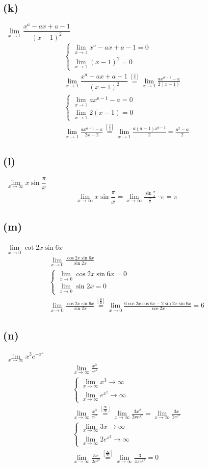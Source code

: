 \documentclass[12pt]{article}
\newcommand{\overfrac}[1]{\overset{[\frac{#1}{#1}]}{=}}
\newcommand{\subproblem}[1]{\subsection{(#1)} \,}
\begin{document}
\subproblem{k}
$\lim\limits_{x\to 1}\dfrac{x^a-ax+a-1}{(x-1)^2}$
\begin{gather*}
    \begin{cases}
        \lim\limits_{x\to 1}x^a-ax+a-1=0\\
        \lim\limits_{x\to 1}(x-1)^2=0
    \end{cases}\\
    \lim\limits_{x\to 1}\dfrac{x^a-ax+a-1}{(x-1)^2}\overfrac{0} \lim\limits_{x\to 1}\frac{ax^{a-1}-a}{2(x-1)}\\
    \begin{cases}
        \lim\limits_{x\to 1}ax^{a-1}-a=0\\
        \lim\limits_{x\to 1}2(x-1)=0
    \end{cases}\\
    \lim\limits_{x\to 1}\frac{ax^{a-1}-a}{2x-2}\overfrac{0}\lim\limits_{x\to 1}\frac{a(a-1)x^{a-2}}{2}=\boxed{\frac{a^2-a}{2}}
\end{gather*}

\subproblem{l}
$\lim\limits_{x\to \infty}x\sin\dfrac{\pi}{x}$
\begin{gather*}
    \lim\limits_{x\to \infty}x\sin\dfrac{\pi}{x}=\lim_{x\to\infty}\frac{\sin{\frac{\pi}{x}}}{\frac{\pi}{x}}\cdot\pi =\boxed{\pi}
\end{gather*}

\subproblem{m}
$\lim\limits_{x\to 0}\cot 2x \sin 6x$
\begin{gather*}
    \lim\limits_{x\to 0}\frac{\cos 2x\sin 6x}{\sin 2x}\\
    \begin{cases}
        \lim\limits_{x\to 0} \cos 2x\sin 6x=0\\
        \lim\limits_{x\to 0}\sin 2x=0
    \end{cases}\\
    \lim\limits_{x\to 0}\frac{\cos 2x\sin 6x}{\sin 2x}\overfrac{0}\lim\limits_{x\to 0}\frac{6\cos 2x \cos 6x-2\sin 2x\sin 6x}{\cos 2x}=\boxed{6}
\end{gather*}

\subproblem{n}
$\lim\limits_{x\to \infty}x^3e^{-x^2}$
\begin{gather*}
    \lim\limits_{x\to \infty}\frac{x^3}{e^{x^2}}\\
    \begin{cases}
        \lim\limits_{x\to \infty}x^3\to \infty\\
        \lim\limits_{x\to \infty}e^{x^2} \to \infty
    \end{cases}\\
    \lim\limits_{x\to \infty}\frac{x^3}{e^{x^2}}\overfrac{\infty}\lim\limits_{x\to \infty}\frac{3x^2}{2xe^{x^2}}=\lim\limits_{x\to \infty}\frac{3x}{2e^{x^2}}\\
    \begin{cases}
        \lim\limits_{x\to \infty}3x\to \infty\\
        \lim\limits_{x\to \infty}2e^{x^2}\to \infty
    \end{cases}\\
    \lim\limits_{x\to \infty}\frac{3x}{2e^{x^2}}\overfrac{\infty}\lim\limits_{x\to \infty}\frac{3}{4xe^{x^2}}=\boxed{0}
\end{gather*}
\end{document}
